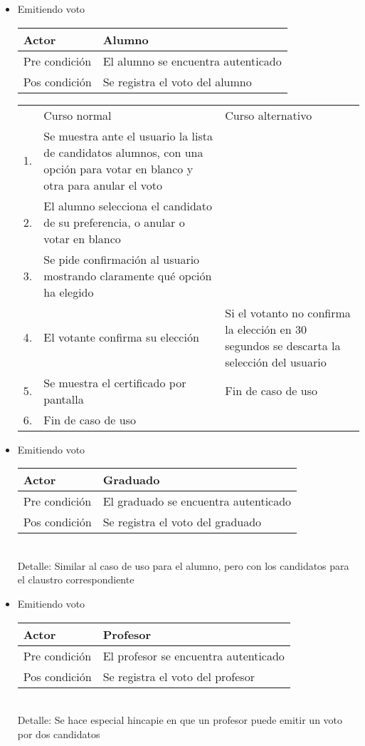 \begin{itemize}
\bigskip
\item Emitiendo voto
\bigskip
\begin{center}
\begin{tabular}{ll}
Actor & Alumno \\
\hline
Pre condición & El alumno se encuentra autenticado \\
\hline
Pos condición & Se registra el voto del alumno\\
\hline
\end{tabular}
\medskip
\begin{tabular}{c p{4cm}|p{4cm}}
 & Curso normal & Curso alternativo \\
 1. & Se muestra ante el usuario la lista de candidatos alumnos, con una opción para votar en blanco y otra para anular el voto &  \\
 2. & El alumno selecciona el candidato de su preferencia, o anular o votar en blanco & \\
 3. & Se pide confirmación al usuario mostrando claramente qué opción ha elegido & \\
 4. & El votante confirma su elección & Si el votanto no confirma la elección en 30 segundos se descarta la selección del usuario \\
 5. & Se muestra el certificado por pantalla & Fin de caso de uso \\
 6. & Fin de caso de uso & \\ 
\end{tabular}
\end{center}

\bigskip
\item Emitiendo voto
\bigskip
\begin{center}
\begin{tabular}{ll}
Actor & Graduado \\
\hline
Pre condición & El graduado se encuentra autenticado \\
\hline
Pos condición & Se registra el voto del graduado\\
\hline
\end{tabular}
\medskip
\\
Detalle: Similar al caso de uso para el alumno, pero con los candidatos para el claustro correspondiente
\end{center}

\bigskip
\item Emitiendo voto
\bigskip
\begin{center}
\begin{tabular}{ll}
Actor & Profesor \\
\hline
Pre condición & El profesor se encuentra autenticado \\
\hline
Pos condición & Se registra el voto del profesor\\
\hline
\end{tabular}
\medskip
\\
Detalle: Se hace especial hincapie en que un profesor puede emitir un voto por dos candidatos
\end{center}


\end{itemize}
